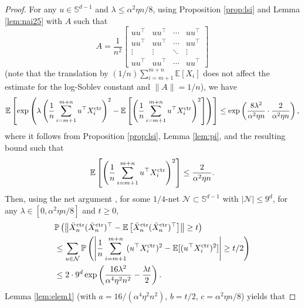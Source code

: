 \documentclass[12pt,reqno]{amsart}
\theoremstyle{remark}
\theoremstyle{definition}
\newcommand{\bbS}{\mathbb{S}}
\newcommand{\calN}{\mathcal{N}}
\newcommand{\E}{\mathbb{E}}
\renewcommand{\Pr}{\mathbb{P}}
\newcommand{\ctr}{\textnormal{ctr}}
\begin{document}
\begin{proof}
    For any $u\in\bbS^{d-1}$ and $\lambda\le \alpha^{2}\eta n/8$, using Proposition \ref{prop:lsi} and Lemma \ref{lem:nai25} with $A$ such that 
    \begin{equation*}
        A = \frac{1}{n^{2}}\left[\begin{matrix}
            uu^{\top} & uu^{\top} & \cdots & uu^{\top}\\
            uu^{\top} & uu^{\top} & \cdots & uu^{\top}\\
            \vdots & \vdots & \ddots & \vdots\\
            uu^{\top} & uu^{\top} & \cdots & uu^{\top}
        \end{matrix}\right]
    \end{equation*}
    (note that the translation by $(1/n)\sum_{i=m+1}^{m+n}\E[X_{i}]$ does not affect the estimate for the log-Soblev constant and $\|A\|=1/n$), we have
    \begin{equation*}
        \E\left[\exp\left(\lambda\left(\frac{1}{n}\sum_{i=m+1}^{m+n}u^{\top}X_{i}^{\ctr}\right)^{2}-\E\left[\left(\frac{1}{n}\sum_{i=m+1}^{m+n}u^{\top}X_{i}^{\ctr}\right)^{2}\right]\right)\right]\le \exp\left(\frac{8\lambda^{2}}{\alpha^{2}\eta n}\cdot\frac{2}{\alpha^{2}\eta n}\right),
    \end{equation*}
    where it follows from Proposition \ref{prop:lsi}, Lemma \ref{lem:pi}, and the resulting bound such that
    \begin{equation*}
        \E\left[\left(\frac{1}{n}\sum_{i=m+1}^{m+n}u^{\top}X_{i}^{\ctr}\right)^{2}\right]\le \frac{2}{\alpha^{2}\eta n}.
    \end{equation*}
    Then, using the net argument \citep{vershynin2018high}, for some $1/4$-net $\calN\subset\bbS^{d-1}$ with $|\calN|\le 9^{d}$, for any $\lambda\in[0,\alpha^{2}\eta n/8]$ and $t\ge0$,
    \begin{align*}
        &\Pr\left(\left\|\bar{X}_{n}^{\ctr}(\bar{X}_{n}^{\ctr})^{\top}-\E\left[\bar{X}_{n}^{\ctr}(\bar{X}_{n}^{\ctr})^{\top}\right]\right\|\ge t\right)\\
        &\le \sum_{u\in\calN}\Pr\left(\left|\frac{1}{n}\sum_{i=m+1}^{m+n}(u^{\top}X_{i}^{\ctr})^{2}-\E[(u^{\top}X_{i}^{\ctr})^{2}]\right|\ge t/2\right)\\
        &\le 2\cdot 9^{d}\exp\left(\frac{16\lambda^{2}}{\alpha^{4}\eta^{2}n^{2}}-\frac{\lambda t}{2}\right).
    \end{align*}
    Lemma \ref{lem:elem1} (with $a=16/(\alpha^{4}\eta^{2}n^{2})$, $b=t/2$, $c=\alpha^{2}\eta n/8$) yields that

\end{proof}
\end{document}
